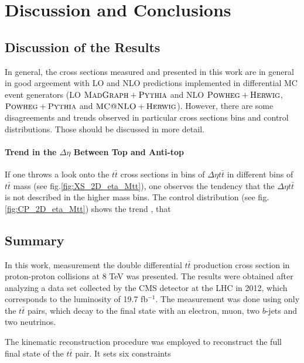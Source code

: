 \chapter{Discussion and Conclusions}\label{chapt:conc}

\section{Discussion of the Results}

In general, the cross sections measured and presented in this work are in general in good argeement with LO and NLO predictions
implemented in differential MC event generators (LO $\textsc{MadGraph}+\textsc{Pythia}$ and NLO $\textsc{Powheg}+\textsc{Herwig}$, $\textsc{Powheg}+\textsc{Pythia}$ and $\textsc{MC@NLO}+\textsc{Herwig}$).
However, there are some disagreements and trends observed in particular cross sections bins and control distributions.
Those should be discussed in more detail.

\subsubsection{Trend in the $\Delta\eta$ Between Top and Anti-top}

If one throws a look onto the $t\bar{t}$ cross sections in bins of $\Delta\eta{t\bar{t}}$ in different bins of $t\bar{t}$ mass
(see fig.\ref{fig:XS_2D_eta_Mtt}), one observes the tendency that the $\Delta\eta{t\bar{t}}$ is not described in the higher mass bins.
The control distribution (see fig. \ref{fig:CP_2D_eta_Mtt}) shows the trend , that 

\section{Summary}
In this work, measurement the double differential $t\bar{t}$ production cross section in proton-proton collisions at 8 TeV was presented.
The results were obtained after analyzing a data set collected by the CMS detector at the LHC in 2012, which corresponds to the 
luminosity of 19.7 fb$^{-1}$. The measurement was done using only the $t\bar{t}$ pairs, which decay to the final state with an
electron, muon, two $b$-jets and two neutrinos.

The kinematic reconstruction procedure was employed to reconstruct the full final state of the $t\bar{t}$ pair. It sets six constraints 

